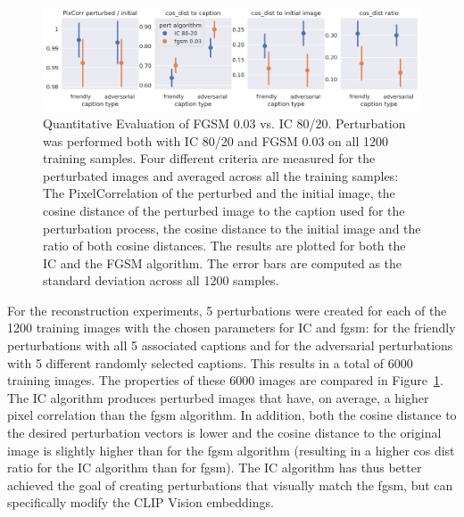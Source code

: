 \begin{figure}[ht]
    \centering
    \includegraphics[width=1\textwidth]{plots/advpert_validation_chosen_perts.png}
    \caption[Quantitative Evaluation of FGSM 0.03 vs. IC 80/20]{Quantitative Evaluation of FGSM 0.03 vs. IC 80/20. Perturbation was performed both with IC 80/20 and FGSM 0.03 on all 1200 training samples. Four different criteria are measured for the perturbated images and averaged across all the training samples: The PixelCorrelation of the perturbed and the initial image, the cosine distance of the perturbed image to the caption used for the perturbation process, the cosine distance to the initial image and the ratio of both cosine distances. The results are plotted for both the IC and the FGSM algorithm. The error bars are computed as the standard deviation across all 1200 samples.}\label{fig:advpert_validation_chosen_perts} 
\end{figure}
    
For the reconstruction experiments, 5 perturbations were created for each of the 1200 training images with the chosen parameters for IC and fgsm: for the friendly perturbations with all 5 associated captions and for the adversarial perturbations with 5 different randomly selected captions. This results in a total of 6000 training images. The properties of these 6000 images are compared in Figure~\ref{fig:advpert_validation_chosen_perts}. The IC algorithm produces perturbed images that have, on average, a higher pixel correlation than the fgsm algorithm. In addition, both the cosine distance to the desired perturbation vectors is lower and the cosine distance to the original image is slightly higher than for the fgsm algorithm (resulting in a higher cos dist ratio for the IC algorithm than for fgsm). The IC algorithm has thus better achieved the goal of creating perturbations that visually match the fgsm, but can specifically modify the CLIP Vision embeddings.

